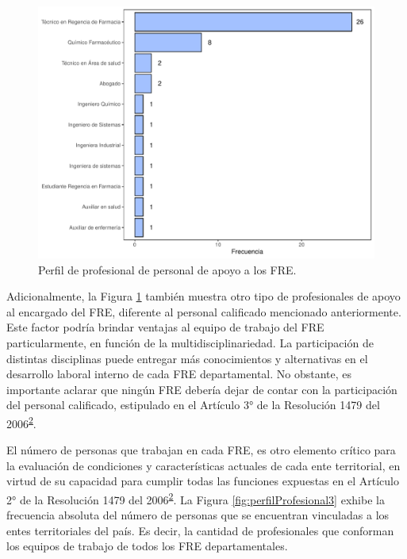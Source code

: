 \documentclass[
]{book}
\begin{document}
\begin{figure}[t!]

{\centering \includegraphics[width=0.9\linewidth]{InformeFinal_files/figure-latex/perfilProfesional2-1} 

}

\caption{Perfil de profesional de personal de apoyo a los FRE.}\label{fig:perfilProfesional2}
\end{figure}

Adicionalmente, la Figura \ref{fig:perfilProfesional2} también muestra otro tipo de profesionales de apoyo al encargado del FRE, diferente al personal calificado mencionado anteriormente. Este factor podría brindar ventajas al equipo de trabajo del FRE particularmente, en función de la multidisciplinariedad. La participación de distintas disciplinas puede entregar más conocimientos y alternativas en el desarrollo laboral interno de cada FRE departamental. No obstante, es importante aclarar que ningún FRE debería dejar de contar con la participación del personal calificado, estipulado en el Artículo 3° de la Resolución 1479 del 2006\textsuperscript{\protect\hyperlink{ref-MSPS1479-2006}{2}}.

El número de personas que trabajan en cada FRE, es otro elemento crítico para la evaluación de condiciones y características actuales de cada ente territorial, en virtud de su capacidad para cumplir todas las funciones expuestas en el Artículo 2° de la Resolución 1479 del 2006\textsuperscript{\protect\hyperlink{ref-MSPS1479-2006}{2}}. La Figura \ref{fig:perfilProfesional3} exhibe la frecuencia absoluta del número de personas que se encuentran vinculadas a los entes territoriales del país. Es decir, la cantidad de profesionales que conforman los equipos de trabajo de todos los FRE departamentales.
\end{document}
